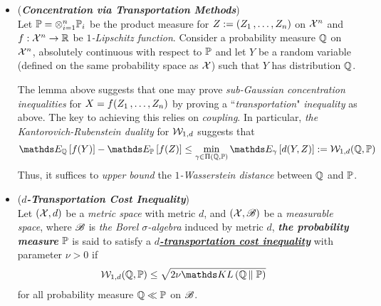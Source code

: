 \documentclass[11pt]{article}
\begin{document}
\begin{itemize}
\item \begin{remark} (\textbf{\emph{Concentration via Transportation Methods}})\\ 
Let ${\mathbb P} = \otimes_{i=1}^{n}{\mathbb P}_i$ be the product measure for $Z := (Z_1 \,{,}\ldots{,}\, Z_n)$ on ${\mathcal X}^n$ and $f: {\mathcal X}^n  \to {\mathbb R}$ be \emph{$1$-Lipschitz function}.  Consider a probability measure ${\mathbb Q}$ on ${\mathcal X}^n$, absolutely continuous with respect to ${\mathbb P}$ and let $Y$ be a random variable (defined on the same probability space as ${\mathcal X}$) such that $Y$ has distribution ${\mathbb Q}$.

The lemma above suggests that one may prove \emph{sub-Gaussian concentration inequalities} for $X = f(Z_1 \,{,}\ldots{,}\, Z_n)$ by proving a ``\emph{transportation}" \emph{inequality} as above. The key to achieving this relies on \emph{coupling}. In particular, \emph{the Kantorovich-Rubenstein duality} for ${\mathcal W}_{1,d}$  suggests that 
\begin{align*}
\E{\bQ}{f(Y)} - \E{\bP}{f(Z)} \le \min_{\gamma \in \Pi (\bQ, \bP)} \E{\gamma}{d(Y, Z)} := \cW_{1,d}( \bQ, \bP)
\end{align*} Thus, it suffices to \emph{upper bound} the \emph{$1$-Wasserstein distance} between ${\mathbb Q}$ and ${\mathbb P}$.
\end{remark}

\item \begin{definition} (\emph{\textbf{$d$-Transportation Cost Inequality}}) \citep{wainwright2019high}\\
Let $({\mathcal X}, d)$ be a \emph{metric space} with metric $d$,  and $({\mathcal X}, {\mathscr B})$ be a \emph{measurable space}, where ${\mathscr B}$ is \emph{the Borel $\sigma$-algebra} induced by metric $d$, \emph{\textbf{the probability measure}} ${\mathbb P}$ is said to satisfy a \underline{\emph{\textbf{$d$-transportation cost inequality}}} with parameter $\nu > 0$ if
\begin{align}
\cW_{1,d}( \bQ, \bP) &\le \sqrt{2\nu\kl{\bQ}{\bP}}  \label{def: transportation_cost_inequality}
\end{align} for all probability measure ${\mathbb Q} \ll {\mathbb P}$ on ${\mathscr B}$.
\end{definition}



\end{itemize}
\end{document}
